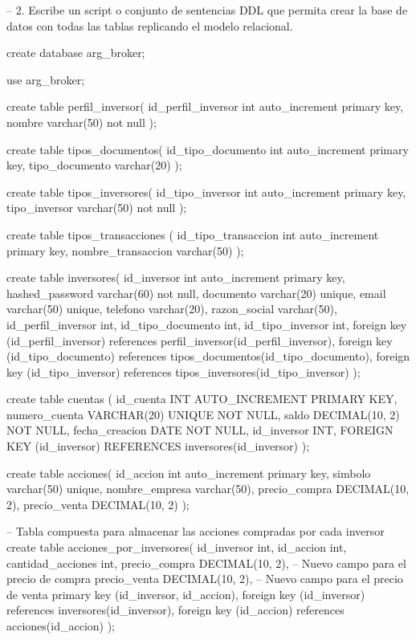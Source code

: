 – 2. Escribe un script o conjunto de sentencias DDL que permita crear la base de datos
con todas las tablas replicando el modelo relacional.

create database arg_broker;

use arg_broker;

create table perfil_inversor(
    id_perfil_inversor int auto_increment primary key,
    nombre varchar(50) not null
);

create table tipos_documentos(
    id_tipo_documento int auto_increment primary key,
    tipo_documento varchar(20)
);

create table tipos_inversores(
    id_tipo_inversor int auto_increment primary key,
    tipo_inversor varchar(50) not null
);

create table tipos_transacciones (
    id_tipo_transaccion int auto_increment primary key,
    nombre_transaccion varchar(50)
);

create table inversores(
    id_inversor int auto_increment primary key,
    hashed_password varchar(60) not null,
    documento varchar(20) unique,
    email varchar(50) unique,
    telefono varchar(20),
    razon_social varchar(50),
    id_perfil_inversor int,
    id_tipo_documento int,
    id_tipo_inversor int,
    foreign key (id_perfil_inversor) references perfil_inversor(id_perfil_inversor),
    foreign key (id_tipo_documento) references tipos_documentos(id_tipo_documento),
    foreign key (id_tipo_inversor) references tipos_inversores(id_tipo_inversor)
);

create table cuentas (
    id_cuenta INT AUTO_INCREMENT PRIMARY KEY,
    numero_cuenta VARCHAR(20) UNIQUE NOT NULL,
    saldo DECIMAL(10, 2) NOT NULL,
    fecha_creacion DATE NOT NULL,
    id_inversor INT,
    FOREIGN KEY (id_inversor) REFERENCES inversores(id_inversor)
);

create table acciones(
    id_accion int auto_increment primary key,
    simbolo varchar(50) unique,
    nombre_empresa varchar(50),
    precio_compra DECIMAL(10, 2),
    precio_venta DECIMAL(10, 2)
);

-- Tabla compuesta para almacenar las acciones compradas por cada inversor
create table acciones_por_inversores(
    id_inversor int,
    id_accion int,
    cantidad_acciones int,
    precio_compra DECIMAL(10, 2), -- Nuevo campo para el precio de compra
    precio_venta DECIMAL(10, 2),  -- Nuevo campo para el precio de venta
    primary key (id_inversor, id_accion),
    foreign key (id_inversor) references inversores(id_inversor),
    foreign key (id_accion) references acciones(id_accion)
);

